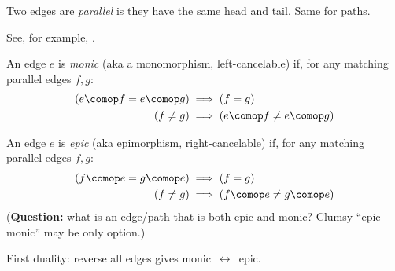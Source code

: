 \documentclass[11pt,openany]{book}
\let\oldfigure\figure%
\let\endoldfigure\endfigure%
\renewenvironment{figure}[1][htbp]%
  {\oldfigure[#1]\mdframed[backgroundcolor=GhostWhite,linecolor=GhostWhite]}
  {\endmdframed\endoldfigure}
\begin{document}
Two edges are \textit{parallel} is they have the same head and tail.
Same for paths.


See, for example, \cite{perrone_2019_cath_notes}.

\begin{figure}
\centering
{}
\caption{Monic edge $e$: 
$\left( f \neq g \right) 
\implies 
\left( e \comop f \, \neq \, e \comop g \right)$.}
\label{fig:monic}
\end{figure}

An edge $e$ is \textit{monic} (aka a monomorphism, left-cancelable)
if, for any matching parallel edges $f,g$:
\begin{align*}
\left( e \comop f = e \comop g \right) 
& 
\implies 
\left( f = g \right) 
\\
\left( f \neq g \right) 
&
\implies 
\left( e \comop f \neq e \comop g \right) 
\end{align*}

\begin{figure}
\centering
{}
\caption{Epic edge $e$: 
$\left( f \neq g \right)
 \implies 
 \left( f \comop e \, \neq \, g \comop e \right)$.}
\label{fig:epic}
\end{figure}

An edge $e$ is \textit{epic} (aka epimorphism, right-cancelable)
if, for any matching parallel edges $f,g$:
\begin{align*}
\left( f \comop e = g \comop e \right) 
& 
\implies 
\left( f = g \right)
\\
\left( f \neq g \right)
& 
\implies 
\left( f \comop e \neq g \comop e \right) 
\end{align*}
(\textbf{Question:} 
what is an edge/path that is both epic and monic?
Clumsy ``epic-monic'' may be only option.)

First duality: reverse all edges gives monic $\,\leftrightarrow\,$ epic.

\begin{figure}
\centering
{}
\caption{Split monic edge $e$, if the two edge path
$V_0 \longrightarrow V_0$
composes to the identity loop.}
\label{fig:split_monic}
\end{figure}
\end{document}
